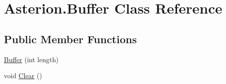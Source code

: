 \hypertarget{classAsterion_1_1Buffer}{\section{Asterion.\-Buffer Class Reference}
\label{classAsterion_1_1Buffer}
}
\subsection*{Public Member Functions}
\begin{DoxyCompactItemize}
\item 
\hyperlink{classAsterion_1_1Buffer_aab3e700233dfe799eeea0fe35e7341c7}{Buffer} (int length)
\item 
void \hyperlink{classAsterion_1_1Buffer_a1c8149248473a8a87baa09b13963da51}{Clear} ()
\end{DoxyCompactItemize}
